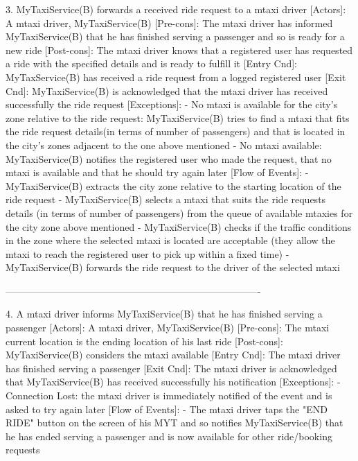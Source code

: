 \documentclass[11pt]{article} %
\begin{document}
      3. MyTaxiService(B) forwards a received ride request to a mtaxi driver
        [Actors]: A mtaxi driver, MyTaxiService(B)
        [Pre-cons]: The mtaxi driver has informed MyTaxiService(B) that he has finished serving a passenger and so is
        ready for a new ride
        [Post-cons]: The mtaxi driver knows that a registered user has requested a ride with the specified
        details and is ready to fulfill it
        [Entry Cnd]: MyTaxService(B) has received a ride request from a logged registered user
        [Exit Cnd]: MyTaxiService(B) is acknowledged that the mtaxi driver has received successfully the ride request
        [Exceptions]:
          - No mtaxi is available for the city's zone relative to the ride request: MyTaxiService(B) tries
          to find a mtaxi that fits the ride request details(in terms of number of passengers) and that is located in the city's zones adjacent
          to the one above mentioned
          - No mtaxi available: MyTaxiService(B) notifies the registered user who made the request, that
          no mtaxi is available and that he should try again later
        [Flow of Events]:
          - MyTaxiService(B) extracts the city zone relative to the starting location of the ride request
          - MyTaxiService(B) selects a mtaxi that suits the ride requests details (in terms of number of passengers) from the queue of available mtaxies
            for the city zone above mentioned
          - MyTaxiService(B) checks if the traffic conditions in the zone where the selected mtaxi is located are acceptable
          (they allow the mtaxi to reach the registered user to pick up within a fixed time)
          - MyTaxiService(B) forwards the ride request to the driver of the selected mtaxi


      -------------------------------------------------------------------------------

      4. A mtaxi driver informs MyTaxiService(B) that he has finished serving a passenger
        [Actors]: A mtaxi driver, MyTaxiService(B)
        [Pre-cons]: The mtaxi current location is the ending location of his last ride
        [Post-cons]: MyTaxiService(B) considers the mtaxi available
        [Entry Cnd]: The mtaxi driver has finished serving a passenger
        [Exit Cnd]: The mtaxi driver is acknowledged that MyTaxiService(B) has received successfully his
        notification
        [Exceptions]:
          - Connection Lost: the mtaxi driver is immediately notified of the event and is asked to try again
          later
        [Flow of Events]:
          - The mtaxi driver taps the "END RIDE" button on the screen of his MYT and so notifies MyTaxiService(B) that
          he has ended serving a passenger and is now available for other ride/booking requests
\end{document}
